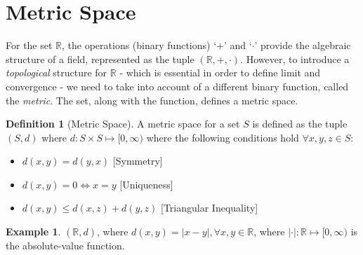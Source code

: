 \documentclass{report}
\theoremstyle{plain}
\theoremstyle{definition}
\newtheorem{definition}[theorem]{Definition} %
\newtheorem{example}[theorem]{Example} %
\begin{document}
\section{Metric Space}
For the set $\mathbb{R}$, the operations (binary functions) `$+$' and `$\cdot$' provide the algebraic structure of a field, represented as the tuple $(\mathbb{R}, +, \cdot)$. However, to introduce a \emph{topological} structure for $\mathbb{R}$ - which is essential in order to define limit and convergence - we need to take into account of a different binary function, called the \emph{metric}. The set, along with the function, defines a metric space.
\begin{definition}[Metric Space]
A metric space for a set $S$ is defined as the tuple $(S, d)$ where $d:S\times S\mapsto[0, \infty)$ where the following conditions hold $\forall x, y, z\in S$:
\begin{itemize}
\item[(a)] $d(x,y)=d(y,x)$ [Symmetry]
\item[(b)] $d(x,y)=0\Leftrightarrow x=y$ [Uniqueness]
\item[(c)] $d(x,y)\le d(x,z)+d(y,z)$ [Triangular Inequality]
\end{itemize}
\end{definition}
\begin{example}
\noindent $(\mathbb{R},d)$, where $d(x,y)=|x-y|, \forall x,y\in\mathbb{R}$, where $|\cdot|:\mathbb{R}\mapsto[0,\infty)$ is the absolute-value function.
\end{example}
\end{document}
